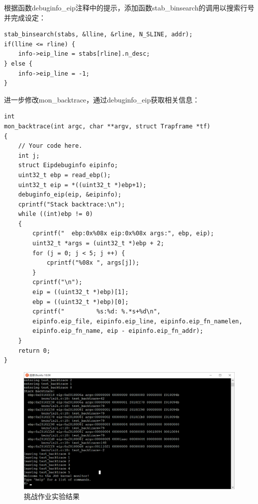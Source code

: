 \documentclass[12pt,a4paper,UTF8]{article}
\begin{document}
根据函数debuginfo\_eip注释中的提示，添加函数stab\_binsearch的调用以搜索行号并完成设定：

\begin{lstlisting}[style=CPP]
stab_binsearch(stabs, &lline, &rline, N_SLINE, addr);
if(lline <= rline) {
	info->eip_line = stabs[rline].n_desc;
} else {
	info->eip_line = -1;
}
\end{lstlisting}

进一步修改mon\_backtrace，通过debuginfo\_eip获取相关信息：

\begin{lstlisting}[style=CPP]
int
mon_backtrace(int argc, char **argv, struct Trapframe *tf)
{
    // Your code here.
	int j;
	struct Eipdebuginfo eipinfo;
    uint32_t ebp = read_ebp();
	uint32_t eip = *((uint32_t *)ebp+1);
	debuginfo_eip(eip, &eipinfo);
    cprintf("Stack backtrace:\n");
    while ((int)ebp != 0)
    {
		cprintf("  ebp:0x%08x eip:0x%08x args:", ebp, eip);
        uint32_t *args = (uint32_t *)ebp + 2;
        for (j = 0; j < 5; j ++) {
            cprintf("%08x ", args[j]);
        }
        cprintf("\n");
        eip = ((uint32_t *)ebp)[1];
		ebp = ((uint32_t *)ebp)[0];
		cprintf("         %s:%d: %.*s+%d\n", 
		eipinfo.eip_file, eipinfo.eip_line, eipinfo.eip_fn_namelen, 
		eipinfo.eip_fn_name, eip - eipinfo.eip_fn_addr);
    }
    return 0;
}
\end{lstlisting}

\begin{figure}[H]
    \centering
    \includegraphics[width = .85\linewidth]{img/ch.png}
    \caption{挑战作业实验结果}
    \label{fig::figurech}
\end{figure}


% 
\end{document}

